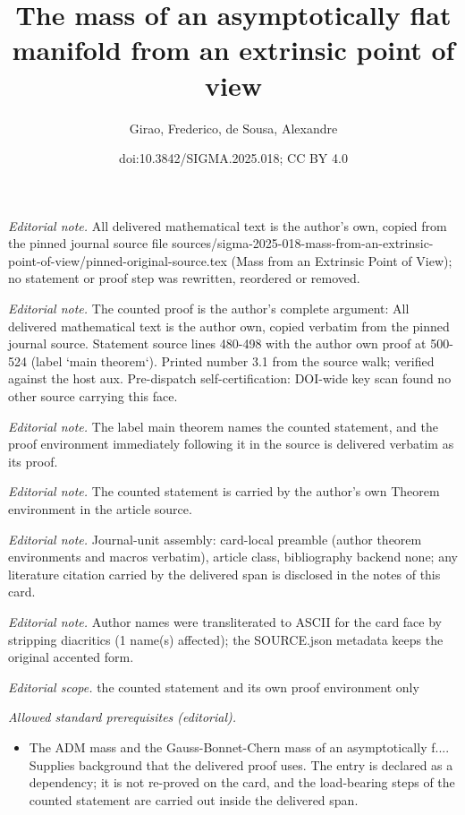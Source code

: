 \documentclass[10pt,a4paper]{article}
\title{The mass of an asymptotically flat manifold from an extrinsic point of view}
\author{Girao, Frederico, de Sousa, Alexandre}
\date{doi:10.3842/SIGMA.2025.018; CC BY 4.0}
\numberwithin{equation}{section}
\begin{document}
\maketitle
\setcounter{section}{3}
\setcounter{Theorem}{5}
\noindent\textit{Editorial note.} All delivered mathematical text is the author's own, copied from the pinned journal source file sources/sigma-2025-018-mass-from-an-extrinsic-point-of-view/pinned-original-source.tex (Mass from an Extrinsic Point of View); no statement or proof step was rewritten, reordered or removed.\par\medskip
\noindent\textit{Editorial note.} The counted proof is the author's complete argument: All delivered mathematical text is the author own, copied verbatim from the pinned journal source. Statement source lines 480-498 with the author own proof at 500-524 (label `main theorem`). Printed number 3.1 from the source walk; verified against the host aux. Pre-dispatch self-certification: DOI-wide key scan found no other source carrying this face.\par\medskip
\noindent\textit{Editorial note.} The label main theorem names the counted statement, and the proof environment immediately following it in the source is delivered verbatim as its proof.\par\medskip
\noindent\textit{Editorial note.} The counted statement is carried by the author's own Theorem environment in the article source.\par\medskip
\noindent\textit{Editorial note.} Journal-unit assembly: card-local preamble (author theorem environments and macros verbatim), article class, bibliography backend none; any literature citation carried by the delivered span is disclosed in the notes of this card.\par\medskip
\noindent\textit{Editorial note.} Author names were transliterated to ASCII for the card face by stripping diacritics (1 name(s) affected); the SOURCE.json metadata keeps the original accented form.\par\medskip
\noindent\textit{Editorial scope.} the counted statement and its own proof environment only\par\medskip
\noindent\textit{Allowed standard prerequisites (editorial).}\begin{itemize}
\item The ADM mass and the Gauss-Bonnet-Chern mass of an asymptotically f.... Supplies background that the delivered proof uses. The entry is declared as a dependency; it is not re-proved on the card, and the load-bearing steps of the counted statement are carried out inside the delivered span.
\end{itemize}\medskip
\end{document}
